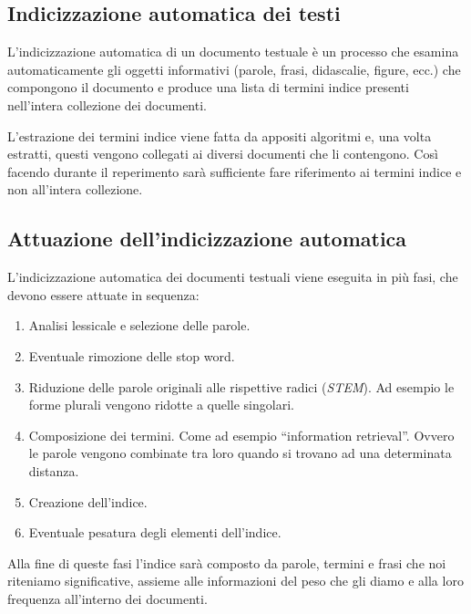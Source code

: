 \subsection{Indicizzazione automatica dei testi}

L'indicizzazione automatica di un documento testuale è un processo che esamina automaticamente gli oggetti informativi (parole, frasi, didascalie, figure, ecc.) che compongono il documento e produce una lista di termini indice presenti nell'intera collezione dei documenti.

L'estrazione dei termini indice viene fatta da appositi algoritmi e, una volta estratti, questi vengono collegati ai diversi documenti che li contengono.
Così facendo durante il reperimento sarà sufficiente fare riferimento ai termini indice e non all'intera collezione.

\subsection{Attuazione dell'indicizzazione automatica}

L'indicizzazione automatica dei documenti testuali viene eseguita in più fasi, che devono essere attuate in sequenza:

\begin{enumerate}
	\item Analisi lessicale e selezione delle parole.
	\item Eventuale rimozione delle stop word.
	\item Riduzione delle parole originali alle rispettive radici (\textit{STEM}). Ad esempio le forme plurali vengono ridotte a quelle singolari.
	\item Composizione dei termini. Come ad esempio ``information retrieval''. Ovvero le parole vengono combinate tra loro quando si trovano ad una determinata distanza.
	\item Creazione dell'indice.
	\item Eventuale pesatura degli elementi dell'indice. 
\end{enumerate}

Alla fine di queste fasi l'indice sarà composto da parole, termini e frasi che noi riteniamo significative, assieme alle informazioni del peso che gli diamo e alla loro frequenza all'interno dei documenti.








